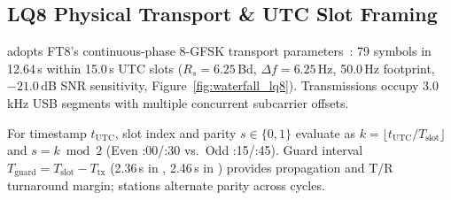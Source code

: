 \begin{table}[htbp]
\centering
\vspace{-3pt}
\caption{CRC-14 channel coding parameter specification.}
\label{tab:crc14_params}
\vspace{-3pt}
\end{table}

\subsection{LQ8 Physical Transport \& UTC Slot Framing}
\label{sec:transport_profiles}
\label{sec:utc_sequence}

 adopts FT8's continuous-phase 8-GFSK transport parameters~\cite{ft8}: 79 symbols in 12.64\,s within 15.0\,s UTC slots ($R_s = 6.25$\,Bd, $\Delta f = 6.25$\,Hz, 50.0\,Hz footprint, $-21.0$\,dB SNR sensitivity, Figure~\ref{fig:waterfall_lq8}). Transmissions occupy 3.0\,kHz USB segments with multiple concurrent subcarrier offsets.

For timestamp $t_{\text{UTC}}$, slot index and parity $s \in \{0, 1\}$ evaluate as $k = \lfloor t_{\text{UTC}} / T_{\text{slot}} \rfloor$ and $s = k \bmod 2$ (Even :00/:30 vs.\ Odd :15/:45). Guard interval $T_{\text{guard}} = T_{\text{slot}} - T_{\text{tx}}$ (2.36\,s in , 2.46\,s in ) provides propagation and T/R turnaround margin; stations alternate parity across cycles.

